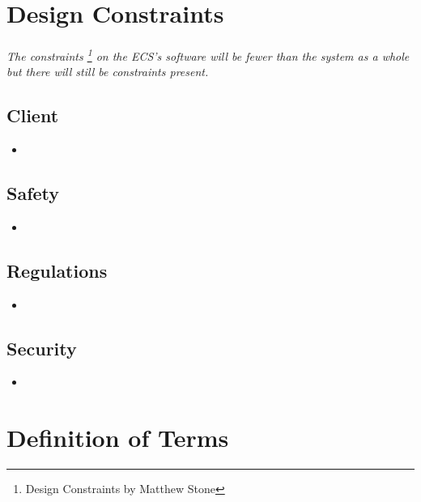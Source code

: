 \documentclass[12pt]{article}
\begin{document}
\section{Design Constraints} \label{cons} %
	\paragraph{} \textit{The constraints \footnote{Design Constraints by Matthew Stone} on the ECS’s software will be fewer than the system 
	as a whole but there will still be constraints present.}

	\subsection{Client}
	\begin{itemize}
		\item 
	\end{itemize}

	\subsection{Safety}
	\begin{itemize}
		\item 
	\end{itemize}

	\subsection{Regulations}
	\begin{itemize}
		\item 
	\end{itemize}

	\subsection{Security}
	\begin{itemize}
		\item 
	\end{itemize}


\section{Definition of Terms} \label{defs} %
\end{document}
